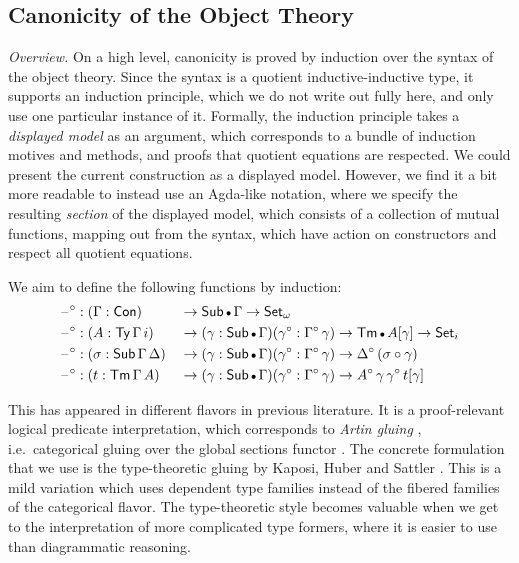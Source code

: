 \documentclass[acmsmall,screen,review,anonymous]{acmart}
\newcommand{\msf}[1]{{\mathsf{#1}}}
\newcommand{\Set}{\msf{Set}}
\newcommand{\blank}{{\mathord{\hspace{1pt}\text{--}\hspace{1pt}}}}
\newcommand{\emptycon}{\scaleobj{.75}\bullet}
\newcommand{\Con}{\msf{Con}}
\newcommand{\Sub}{\msf{Sub}}
\newcommand{\Ty}{\msf{Ty}}
\newcommand{\Tm}{\msf{Tm}}
\newcommand{\w}{\circ}
\begin{document}
\subsection{Canonicity of the Object Theory}\label{sec:canonicity-model}

\emph{Overview.} On a high level, canonicity is proved by induction over the syntax of the object
theory. Since the syntax is a quotient inductive-inductive type, it supports an induction principle,
which we do not write out fully here, and only use one particular instance of it. Formally, the
induction principle takes a \emph{displayed model} as an argument, which corresponds to a bundle of
induction motives and methods, and proofs that quotient equations are respected. We could present
the current construction as a displayed model. However, we find it a bit more readable to instead
use an Agda-like notation, where we specify the resulting \emph{section} of the displayed model,
which consists of a collection of mutual functions, mapping out from the syntax, which have action on
constructors and respect all quotient equations.

We aim to define the following functions by induction:
\begin{alignat*}{3}
  &\blank^\w : (\Gamma : \Con)      && \to \Sub\,\emptycon\,\Gamma \to \Set_\omega\\
  &\blank^\w : (A : \Ty\,\Gamma\,i) && \to (\gamma : \Sub\,\emptycon\,\Gamma)(\gamma^\w : \Gamma^\w\,\gamma) \to \Tm\,\emptycon\,A[\gamma] \to \Set_i\\
  &\blank^\w : (\sigma : \Sub\,\Gamma\,\Delta) && \to (\gamma : \Sub\,\emptycon\,\Gamma)(\gamma^\w : \Gamma^\w\,\gamma) \to \Delta^\w\,(\sigma \circ \gamma)\\
  &\blank^\w : (t : \Tm\,\Gamma\,A) && \to (\gamma : \Sub\,\emptycon\,\Gamma)(\gamma^\w : \Gamma^\w\,\gamma) \to A^\w\,\gamma\,\gamma^\w\,t[\gamma]
\end{alignat*}

This has appeared in different flavors in previous literature. It is a proof-relevant logical
predicate interpretation, which corresponds to \emph{Artin gluing} \cite{TODO}, i.e.\ categorical
gluing over the global sections functor \cite{TODO}. The concrete formulation that we use is the
type-theoretic gluing by Kaposi, Huber and Sattler \cite{TODO}. This is a mild variation which uses
dependent type families instead of the fibered families of the categorical flavor. The
type-theoretic style becomes valuable when we get to the interpretation of more complicated type
formers, where it is easier to use than diagrammatic reasoning.
\end{document}

